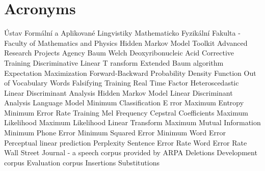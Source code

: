 \chapter{Acronyms}
\label{cha:acronyms}

\begin{acronym}[TDMA]
     {\'{U}stav Form\'{a}ln\'{i} a Aplikovan\'{e} Lingvistiky}
     {Mathematicko Fyzik\'{a}ln\'{i} Fakulta - Faculty of Mathematics and Physics}
     {Hidden Markov Model Toolkit}
     {Advanced Research Projects Agency}
     {Baum Welch}
     {Deoxyribonucleic Acid}
     {Corrective Training}
     {Discriminative Linear T ransform}
     {Extended Baum algorithm}
     {Expectation Maximization}
     {Forward-Backward}
     {Probability Density Function}
     {Out of Vocabulary Words}
     {Falsifying Training}
     {Real Time Factor}
     {Heteroscedastic Linear Discriminant Analysis}
     {Hidden Markov Model}
     {Linear Discriminant Analysis}
     {Language Model}
     {Minimum Classification E rror}
     {Maximum Entropy}
     {Minimum Error Rate Training}
     {Mel Frequency Cepstral Coefficients}
     {Maximum Likelihood}
     {Maximum Likelihood Linear Transform}
     {Maximum Mutual Information}
     {Minimum Phone Error}
     {Minimum Squared Error}
     {Minimum Word Error}
     {Perceptual linear prediction}
     {Perplexity}
     {Sentence Error Rate}
     {Word Error Rate}
     {Wall Street Journal - a speech corpus provided by ARPA}
     {Deletions}
     {Development corpus}
     {Evaluation corpus}
     {Insertions}
     {Substitutions}
\end{acronym}

